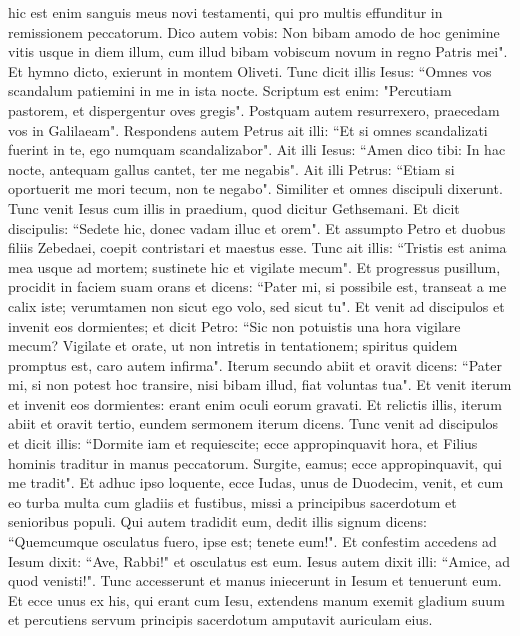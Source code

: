 \begin{biblechapter}
\verse hic est enim sanguis meus novi testamenti, qui pro multis effunditur in remissionem peccatorum. 
\verse Dico autem vobis: Non bibam amodo de hoc genimine vitis usque in diem illum, cum illud bibam vobiscum novum in regno Patris mei". 
\verse Et hymno dicto, exierunt in montem Oliveti. 
\verse Tunc dicit illis Iesus: “Omnes vos scandalum patiemini in me in ista nocte. Scriptum est enim: "Percutiam pastorem, et dispergentur oves gregis". 
\verse Postquam autem resurrexero, praecedam vos in Galilaeam". 
\verse Respondens autem Petrus ait illi: “Et si omnes scandalizati fuerint in te, ego numquam scandalizabor". 
\verse Ait illi Iesus: “Amen dico tibi: In hac nocte, antequam gallus cantet, ter me negabis". 
\verse Ait illi Petrus: “Etiam si oportuerit me mori tecum, non te negabo". Similiter et omnes discipuli dixerunt. 
\verse Tunc venit Iesus cum illis in praedium, quod dicitur Gethsemani. Et dicit discipulis: “Sedete hic, donec vadam illuc et orem". 
\verse Et assumpto Petro et duobus filiis Zebedaei, coepit contristari et maestus esse. 
\verse Tunc ait illis: “Tristis est anima mea usque ad mortem; sustinete hic et vigilate mecum". 
\verse Et progressus pusillum, procidit in faciem suam orans et dicens: “Pater mi, si possibile est, transeat a me calix iste; verumtamen non sicut ego volo, sed sicut tu". 
\verse Et venit ad discipulos et invenit eos dormientes; et dicit Petro: “Sic non potuistis una hora vigilare mecum? 
\verse Vigilate et orate, ut non intretis in tentationem; spiritus quidem promptus est, caro autem infirma". 
\verse Iterum secundo abiit et oravit dicens: “Pater mi, si non potest hoc transire, nisi bibam illud, fiat voluntas tua". 
\verse Et venit iterum et invenit eos dormientes: erant enim oculi eorum gravati. 
\verse Et relictis illis, iterum abiit et oravit tertio, eundem sermonem iterum dicens.  
\verse Tunc venit ad discipulos et dicit illis: “Dormite iam et requiescite; ecce appropinquavit hora, et Filius hominis traditur in manus peccatorum. 
\verse Surgite, eamus; ecce appropinquavit, qui me tradit". 
\verse Et adhuc ipso loquente, ecce Iudas, unus de Duodecim, venit, et cum eo turba multa cum gladiis et fustibus, missi a principibus sacerdotum et senioribus populi. 
\verse Qui autem tradidit eum, dedit illis signum dicens: “Quemcumque osculatus fuero, ipse est; tenete eum!". 
\verse Et confestim accedens ad Iesum dixit: “Ave, Rabbi!" et osculatus est eum. 
\verse Iesus autem dixit illi: “Amice, ad quod venisti!". Tunc accesserunt et manus iniecerunt in Iesum et tenuerunt eum. 
\verse Et ecce unus ex his, qui erant cum Iesu, extendens manum exemit gladium suum et percutiens servum principis sacerdotum amputavit auriculam eius. 

\end{biblechapter}
